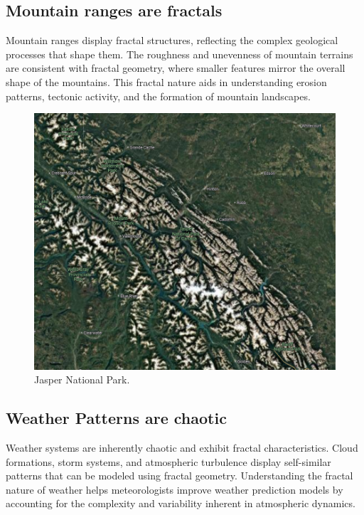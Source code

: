\documentclass[12pt]{article}
\begin{document}
\newpage

\subsection{Mountain ranges are fractals}
Mountain ranges display fractal structures, reflecting the complex geological processes that shape them. The roughness and unevenness of mountain terrains are consistent with fractal geometry, where smaller features mirror the overall shape of the mountains. This fractal nature aids in understanding erosion patterns, tectonic activity, and the formation of mountain landscapes.

\begin{figure}[H]
\centering
\includegraphics[width=\textwidth]{assets/fractal-jasper.png}
\caption{Jasper National Park.}
\label{fig:fractal-jasper}
\end{figure}

\newpage

\subsection{Weather Patterns are chaotic}
Weather systems are inherently chaotic and exhibit fractal characteristics. Cloud formations, storm systems, and atmospheric turbulence display self-similar patterns that can be modeled using fractal geometry. Understanding the fractal nature of weather helps meteorologists improve weather prediction models by accounting for the complexity and variability inherent in atmospheric dynamics.
\end{document}
